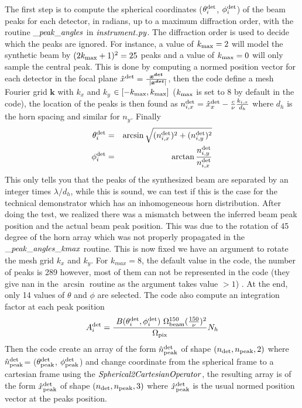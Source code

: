 \documentclass[a4paper, 11pt]{article}
\def\ba{\begin{eqnarray}}
\def\ea{\end{eqnarray}}
\begin{document}
\begin{enumerate}
The first step is to compute the spherical coordinates ($\theta^{\rm det}_{i}$, $\phi^{\rm det}_{i}$) of the beam peaks for each detector, in radians, up to a maximum diffraction order,  with the routine ${\it \_peak\_angles}$ in  ${\it instrument.py}$.
The diffraction order is used to decide which the peaks are ignored. For instance, a value of $k_{\rm max}=2$ will model the synthetic beam by $(2  k_{\rm max} + 1)^{2} = 25$ peaks and a value of $k_{\rm max}=0 $ will only sample the central peak.
This is done by computing a normed position vector for each detector in the focal plane $\hat{x}^{\rm det}= \frac{ \bm{x^{det}}}{ |\bm{x^{det}}|}$, then the code define a mesh Fourier grid $\bm{k}$ with $k_{x}$ and $k_{y}$ $\in [-k_{\rm max}, k_{\rm max}]$ ($k_{\rm max}$ is set to 8 by default in the code), the location of the peaks is then found as $n^{\rm det}_{i,x}= \hat{x}^{\rm det}_{x} - \frac{c}{\nu} \frac{k_{i,x}}{d_{h}}$ where $d_{h}$ is the horn spacing and similar for $n_{y}$.
 Finally 
\ba
\theta_{i}^{\rm det} &=&\arcsin \sqrt{( n^{\rm det}_{i,x})^{2} + (n^{\rm det}_{i,y})^{2} } \\
\phi_{i}^{\rm det}&=&\arctan \frac{n^{\rm det}_{i,y} }{n^{\rm det}_{i,x}} 
\ea
This only tells you that the peaks of the synthesized beam are separated by an integer times  $\lambda/ d_{h}$, while this is sound, we can test if this is the case for the technical demonstrator which has an inhomogeneous horn distribution.
After doing the test, we realized there was a mismatch between the inferred beam peak position and the actual beam peak position. This was due to the rotation of 45 degree of the horn array which was not properly propagated in the ${\it \_peak\_angles\_kmax}$ routine. This is now fixed we have an argument to rotate the mesh grid  $k_{x}$ and $k_{y}$. For $k_{max}=8$, the default value in the code, the number of peaks is 289 however, most of them can not be represented in the code (they give nan in the  $\arcsin$ routine as the argument takes value $>1$) . At the end, only 14 values of $\theta$ and $\phi$ are selected. The code also compute an integration factor at each peak position
\ba
A_{i}^{\rm det}= \frac{ B(\theta_{i}^{\rm det} , \phi_{i}^{\rm det}) \Omega^{150}_{\rm beam} (\frac{150}{\nu})^{2}}{\Omega_{\rm pix}} N_{h}
\ea
Then the code create an array of the form $\hat{n}^{\rm  det}_{\rm peak}$  of shape $(n_{\rm det}, n_{\rm peak}, 2)$ where $\hat{n}_{\rm peak}^{\rm det}$= ($\theta^{\rm det}_{\rm peak}$, $\phi^{\rm det}_{\rm peak}$)  and change coordinate from the spherical frame to a cartesian frame using the $\it{Spherical2CartesianOperator}$, the resulting array is of the form $\hat{x}_{\rm peak}^{\rm  det}$  of shape $(n_{\rm det}, n_{\rm peak}, 3)$ where $\hat{x}_{\rm peak}^{\rm  det}$ is the usual normed position vector at the peaks position.

\end{enumerate}
\end{document}
